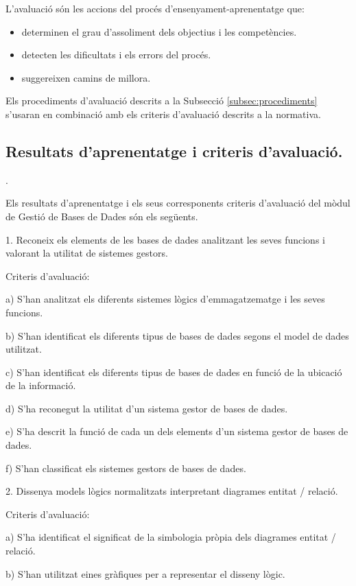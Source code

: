 \documentclass[catalan, a4paper, 12pt, titlepage]{article}
\begin{document}
L'avaluació \cite{coll2017} són les accions del procés d'ensenyament-aprenentatge que:

\begin{itemize}
	\item determinen el grau d'assoliment dels objectius i les competències.
	\item detecten les dificultats i els errors del procés.
	\item suggereixen camins de millora.
\end{itemize}

Els procediments d'avaluació descrits a la Subsecció \ref{subsec:procediments} s'usaran en combinació amb els criteris d'avaluació descrits a la normativa.

\subsection{Resultats d'aprenentatge i criteris d'avaluació.}
\label{subsec:resultats}.

Els resultats d'aprenentatge i els seus corresponents criteris d'avaluació del mòdul de Gestió de Bases de Dades són els següents.

1. Reconeix els elements de les bases de dades analitzant les seves funcions i valorant la utilitat de sistemes gestors.

Criteris d'avaluació:

a) S'han analitzat els diferents sistemes lògics d'emmagatzematge i les seves funcions.

b) S'han identificat els diferents tipus de bases de dades segons el model de dades utilitzat.

c) S'han identificat els diferents tipus de bases de dades en funció de la ubicació de la informació.

d) S'ha reconegut la utilitat d'un sistema gestor de bases de dades.

e) S'ha descrit la funció de cada un dels elements d'un sistema gestor de bases de dades.

f) S'han classificat els sistemes gestors de bases de dades.

2. Dissenya models lògics normalitzats interpretant diagrames entitat / relació.

Criteris d'avaluació:

a) S'ha identificat el significat de la simbologia pròpia dels diagrames entitat / relació.

b) S'han utilitzat eines gràfiques per a representar el disseny lògic.
\end{document}

